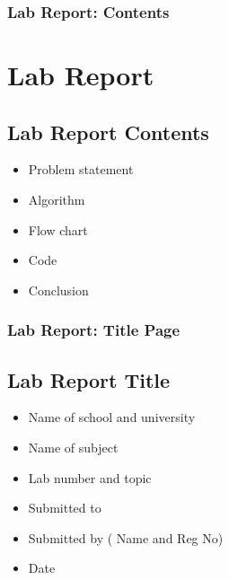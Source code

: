 \documentclass{beamer}
\begin{document}
\begin{frame}
    \frametitle{Lab Report: Contents}
    \section{Lab Report} %
    \label{sec:lab_report}
    \subsection{Lab Report Contents} %
    \label{sub:lab_report_contents}
    \begin{itemize}
        \item Problem statement
        \item Algorithm
        \item Flow chart
        \item Code
        \item Conclusion
    \end{itemize}
\end{frame}

\begin{frame}
    \frametitle{Lab Report: Title Page}
    \subsection{Lab Report Title} %
    \label{sub:lab_report_title}
    \begin{itemize}
        \item Name of school and university
        \item Name of subject
        \item Lab number and topic
        \item Submitted to
        \item Submitted by ( Name and Reg No)
        \item Date
    \end{itemize}
\end{frame}
\end{document}

